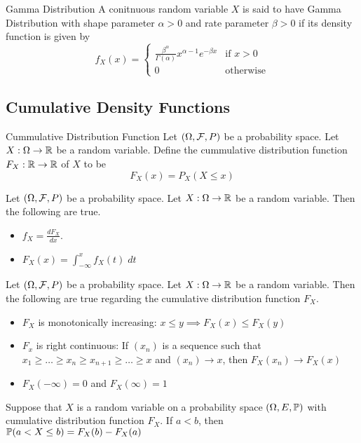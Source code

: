 \documentclass[a4paper]{article}
\begin{document}
\begin{defn}{Gamma Distribution}{} A conitnuous random variable $X$ is said to have Gamma Distribution with shape parameter $\alpha>0$ and rate parameter $\beta>0$ if its density function is given by $$f_X(x)=\begin{cases}
\frac{\beta^\alpha}{\Gamma(\alpha)}x^{\alpha-1}e^{-\beta x} & \text{if $x>0$}\\
0 & \text{otherwise}
\end{cases}$$
\end{defn}

\subsection{Cumulative Density Functions}
\begin{defn}{Cummulative Distribution Function}{} Let $(\Omega,\mathcal{F},P)$ be a probability space. Let $X:\Omega\to\mathbb{R}$ be a random variable. Define the cummulative distribution function $F_X:\mathbb{R}\to\mathbb{R}$ of $X$ to be $$F_X(x)=P_X(X\leq x)$$
\end{defn}

\begin{prp}{}{} Let $(\Omega,\mathcal{F},P)$ be a probability space. Let $X:\Omega\to\mathbb{R}$ be a random variable. Then the following are true. 
\begin{itemize}
\item $f_X=\frac{dF_X}{dx}$. 
\item $F_X(x)=\int_{-\infty}^xf_X(t)\;dt$
\end{itemize}
\end{prp}

\begin{prp}{}{} Let $(\Omega,\mathcal{F},P)$ be a probability space. Let $X:\Omega\to\mathbb{R}$ be a random variable. Then the following are true regarding the cumulative distribution function $F_X$. 
\begin{itemize}
\item $F_X$ is monotonically increasing: $x\leq y\implies F_X(x)\leq F_X(y)$
\item $F_x$ is right continuous: If $(x_n)$ is a sequence such that $x_1\geq\dots\geq x_n\geq x_{n+1}\geq\dots\geq x$ and $(x_n)\to x$, then $F_X(x_n)\to F_X(x)$
\item $F_X(-\infty)=0$ and $F_X(\infty)=1$
\end{itemize}
\end{prp}

\begin{prp}{}{} Suppose that $X$ is a random variable on a probability space $(\Omega,E,\mathbb{P})$ with cumulative distribution function $F_X$. If $a<b$, then $\mathbb{P}(a<X\leq b)=F_X(b)-F_X(a)$
\end{prp}
\end{document}
